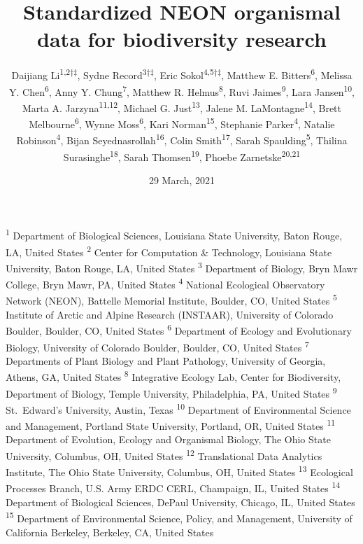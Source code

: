 \documentclass[
  12pt,
]{article}
\title{Standardized NEON organismal data for biodiversity research}
\author{Daijiang Li\textsuperscript{1,2†‡}, Sydne Record\textsuperscript{3†‡}, Eric Sokol\textsuperscript{4,5†‡}, Matthew E. Bitters\textsuperscript{6}, Melissa Y. Chen\textsuperscript{6}, Anny Y. Chung\textsuperscript{7}, Matthew R. Helmus\textsuperscript{8}, Ruvi Jaimes\textsuperscript{9}, Lara Jansen\textsuperscript{10}, Marta A. Jarzyna\textsuperscript{11,12}, Michael G. Just\textsuperscript{13}, Jalene M. LaMontagne\textsuperscript{14}, Brett Melbourne\textsuperscript{6}, Wynne Moss\textsuperscript{6}, Kari Norman\textsuperscript{15}, Stephanie Parker\textsuperscript{4}, Natalie Robinson\textsuperscript{4}, Bijan Seyednasrollah\textsuperscript{16}, Colin Smith\textsuperscript{17}, Sarah Spaulding\textsuperscript{5}, Thilina Surasinghe\textsuperscript{18}, Sarah Thomsen\textsuperscript{19}, Phoebe Zarnetske\textsuperscript{20,21}}
\date{29 March, 2021}
\makeatletter
\newcommand\iraggedright{%
  \let\\\@centercr\@rightskip\@flushglue \rightskip\@rightskip
  \leftskip\z@skip}
\makeatother
\begin{document}
\maketitle

\iraggedright

\footnotesize

\textsuperscript{1} Department of Biological Sciences, Louisiana State University, Baton Rouge, LA, United States\\
\textsuperscript{2} Center for Computation \& Technology, Louisiana State University, Baton Rouge, LA, United States\\
\textsuperscript{3} Department of Biology, Bryn Mawr College, Bryn Mawr, PA, United States\\
\textsuperscript{4} National Ecological Observatory Network (NEON), Battelle Memorial Institute, Boulder, CO, United States\\
\textsuperscript{5} Institute of Arctic and Alpine Research (INSTAAR), University of Colorado Boulder, Boulder, CO, United States\\
\textsuperscript{6} Department of Ecology and Evolutionary Biology, University of Colorado Boulder, Boulder, CO, United States\\
\textsuperscript{7} Departments of Plant Biology and Plant Pathology, University of Georgia, Athens, GA, United States\\
\textsuperscript{8} Integrative Ecology Lab, Center for Biodiversity, Department of Biology, Temple University, Philadelphia, PA, United States
\textsuperscript{9} St.~Edward's University, Austin, Texas
\textsuperscript{10} Department of Environmental Science and Management, Portland State University, Portland, OR, United States\\
\textsuperscript{11} Department of Evolution, Ecology and Organismal Biology, The Ohio State University, Columbus, OH, United States\\
\textsuperscript{12} Translational Data Analytics Institute, The Ohio State University, Columbus, OH, United States\\
\textsuperscript{13} Ecological Processes Branch, U.S. Army ERDC CERL, Champaign, IL, United States\\
\textsuperscript{14} Department of Biological Sciences, DePaul University, Chicago, IL, United States\\
\textsuperscript{15} Department of Environmental Science, Policy, and Management, University of California Berkeley, Berkeley, CA, United States\\
\end{document}
